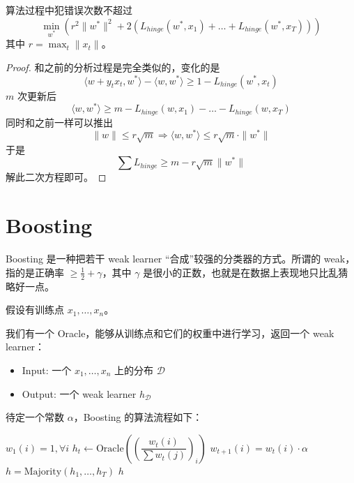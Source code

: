 \begin{theorem}
    算法过程中犯错误次数不超过
    \[
        \min_{w^*} (r^2 \|w^*\|^2 + 2(L_{hinge}(w^*, x_1) + \dots + L_{hinge}(w^*, x_T)))
    \]
    其中 $r = \max_t \|x_t\|$。
\end{theorem}

\begin{proof}
    和之前的分析过程是完全类似的，变化的是
    \[
        \langle w + y_t x_t, w^* \rangle - \langle w, w^* \rangle \ge 1 - L_{hinge}(w^*, x_t)
    \]
    $m$ 次更新后
    \[
        \langle w, w^* \rangle \ge m - L_{hinge}(w, x_1) - \dots - L_{hinge}(w, x_T)
    \]
    同时和之前一样可以推出 
    \[
        \|w\| \le r\sqrt{m} \Rightarrow \langle w, w^* \rangle \le r\sqrt{m} \cdot \|w^*\|
    \]
    于是
    \[
        \sum L_{hinge} \ge m - r\sqrt{m}\|w^*\|
    \]
    解此二次方程即可。
\end{proof}

\section{Boosting}

Boosting 是一种把若干 weak learner “合成”较强的分类器的方式。所谓的 weak，指的是正确率 $\ge \frac{1}{2} + \gamma$，其中 $\gamma$ 是很小的正数，也就是在数据上表现地只比乱猜略好一点。

假设有训练点 $x_1, \dots, x_n$。 

我们有一个 Oracle，能够从训练点和它们的权重中进行学习，返回一个 weak learner：
\begin{itemize}[noitemsep]
    \item[] Input: 一个 $x_1, \dots, x_n$ 上的分布 $\mathcal{D}$
    \item[] Output: 一个 weak learner $h_\mathcal{D}$ 
\end{itemize}

待定一个常数 $\alpha$，Boosting 的算法流程如下：

\begin{algorithm}[h]
    \caption{Boosting}
    \begin{algorithmic}[1]
        \State $w_1(i) = 1, \forall i$
            \State $h_t \leftarrow \text{Oracle}\left(\left(\dfrac{w_t(i)}{\sum w_t(j)}\right)_i\right)$
                    \State $w_{t+1}(i) = w_t(i) \cdot \alpha$
                \EndIf
            \EndFor
        \EndFor
        \State $h = \text{Majority}(h_1, \dots, h_T)$
        \State \Return $h$
    \end{algorithmic}
\end{algorithm}

